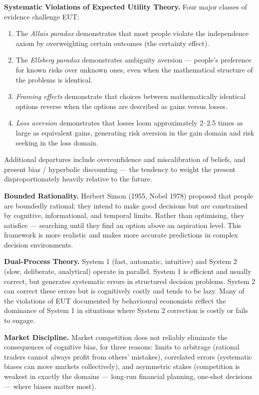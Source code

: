 \documentclass[12pt, letterpaper]{article}
\begin{document}
\textbf{Systematic Violations of Expected Utility Theory.} Four major classes of evidence challenge EUT:
\begin{enumerate}
\item The \textit{Allais paradox} demonstrates that most people violate the independence axiom by overweighting certain outcomes (the certainty effect).
\item The \textit{Ellsberg paradox} demonstrates ambiguity aversion --- people's preference for known risks over unknown ones, even when the mathematical structure of the problems is identical.
\item \textit{Framing effects} demonstrate that choices between mathematically identical options reverse when the options are described as gains versus losses.
\item \textit{Loss aversion} demonstrates that losses loom approximately 2--2.5 times as large as equivalent gains, generating risk aversion in the gain domain and risk seeking in the loss domain.
\end{enumerate}

Additional departures include overconfidence and miscalibration of beliefs, and present bias / hyperbolic discounting --- the tendency to weight the present disproportionately heavily relative to the future.

\textbf{Bounded Rationality.} Herbert Simon (1955, Nobel 1978) proposed that people are boundedly rational: they intend to make good decisions but are constrained by cognitive, informational, and temporal limits. Rather than optimising, they satisfice --- searching until they find an option above an aspiration level. This framework is more realistic and makes more accurate predictions in complex decision environments.

\textbf{Dual-Process Theory.} System 1 (fast, automatic, intuitive) and System 2 (slow, deliberate, analytical) operate in parallel. System 1 is efficient and usually correct, but generates systematic errors in structured decision problems. System 2 can correct these errors but is cognitively costly and tends to be lazy. Many of the violations of EUT documented by behavioural economists reflect the dominance of System 1 in situations where System 2 correction is costly or fails to engage.

\textbf{Market Discipline.} Market competition does not reliably eliminate the consequences of cognitive bias, for three reasons: limits to arbitrage (rational traders cannot always profit from others' mistakes), correlated errors (systematic biases can move markets collectively), and asymmetric stakes (competition is weakest in exactly the domains --- long-run financial planning, one-shot decisions --- where biases matter most).
\end{document}
